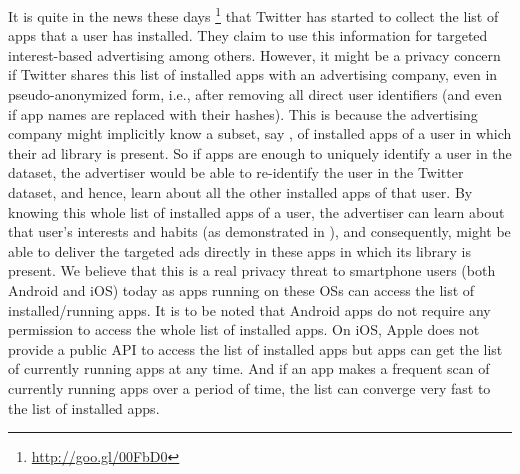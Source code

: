 \documentclass{acm_proc_article-sp}
\theoremstyle{plain}
\theoremstyle{plain}
\theoremstyle{plain}
\theoremstyle{plain}
\theoremstyle{plain}
\theoremstyle{plain}
\begin{document}
It is quite in the news these days
\footnote{\url{http://goo.gl/00FbD0}}
that Twitter has started to collect the list of apps that a user has installed.
They claim to use this information for targeted interest-based advertising among others.
However, it might be a privacy concern if Twitter shares this list of installed apps with an advertising company, even in pseudo-anonymized form, i.e., after removing all direct user identifiers (and even if app names are replaced with their hashes).
This is because the advertising company might implicitly know a subset, say , of installed apps of a user in which their ad library is present.
So if  apps are enough to uniquely identify a user in the dataset, the advertiser would be able to re-identify the user in the Twitter dataset, and hence, learn about all the other installed apps of that user.
By knowing this whole list of installed apps of a user, the advertiser can learn about that user's interests and habits (as demonstrated in \cite{Seneviratne:2014}), and consequently, might be able to deliver the targeted ads directly in these apps in which its library is present. We believe that this is a real privacy threat to smartphone users (both Android and iOS) today as apps running on these OSs can access the list of installed/running apps.
It is to be noted that Android apps do not require any permission to access the whole list of installed apps.
On iOS, Apple does not provide a public API to access the list of installed apps but apps can get the list of currently running apps at any time.
And if an app makes a frequent scan of currently running apps over a period of time, the list can converge very fast to the list of installed apps.
 
\end{document}
